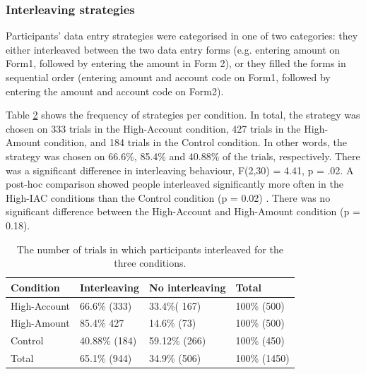 \begin{table}
\begin{itemize}
\subsubsection{Interleaving strategies}

Participants' data entry strategies were categorised in one of two categories: they either interleaved between the two data entry forms (e.g. entering amount on Form1, followed by entering the amount in Form 2), or they filled the forms in sequential order (entering amount and account code on Form1, followed by entering the amount and account code on Form2).

Table \ref{table:ch34_Study5interleavingfreqtbl} shows the frequency of strategies per condition. In total, the strategy was chosen on 333 trials in the High-Account condition, 427 trials in the High-Amount condition, and 184 trials in the Control condition. In other words, the strategy was chosen on 66.6\%, 85.4\% and 40.88\% of the trials, respectively.  There was a significant difference in interleaving behaviour,
F(2,30) = 4.41, p = .02. A post-hoc comparison showed people interleaved significantly more often in the High-IAC conditions than the Control condition  (p = 0.02) . There was no significant difference between the High-Account and High-Amount condition (p = 0.18).



\begin{table}[]
\centering
\begin{tabular}{|l|l|l|l|}
\hline
Condition    & Interleaving & No interleaving & Total \\ \hline
High-Account & 66.6\% (333)          & 33.4\%( 167)             & 100\% (500)   \\ \hline
High-Amount  & 85.4\% 427          & 14.6\% (73)              & 100\% (500)   \\ \hline
Control      & 40.88\% (184)          & 59.12\% (266)             & 100\% (450)   \\ \hline
Total             & 65.1\% (944)          & 34.9\% (506)             & 100\% (1450)  \\ \hline
\end{tabular}
\caption{The number of trials in which participants interleaved for the three conditions.}\label{table:ch34_Study5interleavingfreqtbl}
\end{table}


\end{itemize}
\end{table}
